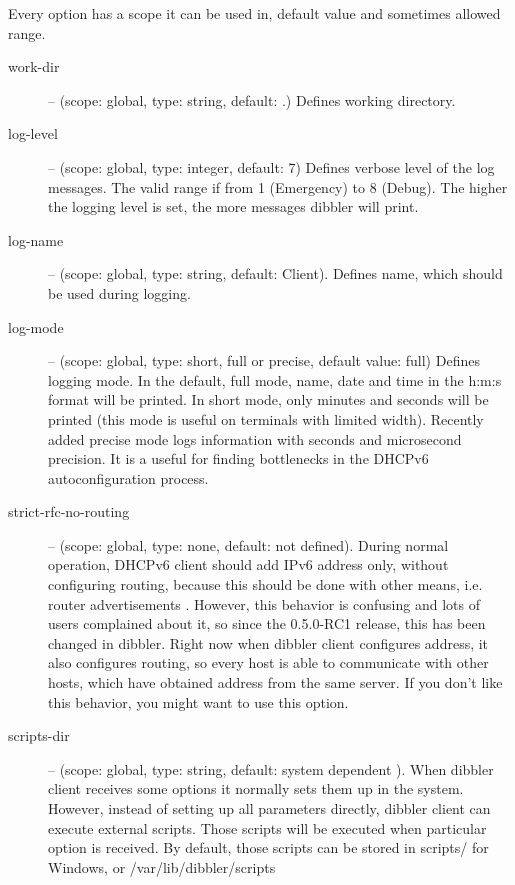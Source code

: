 Every option has a scope it can be used in, default value and
sometimes allowed range. 

\begin{description}
 \item[work-dir] -- (scope: global, type: string, default: .) Defines working
	    directory.
 \item[log-level] -- (scope: global, type: integer, default: 7) Defines
	    verbose level of the log messages. The valid range if
	    from 1 (Emergency) to 8 (Debug). The higher the logging
	    level is set, the more messages dibbler will print.
 \item[log-name] -- (scope: global, type: string, default: Client). Defines 
	    name, which should be used during logging.
 \item[log-mode] -- (scope: global, type: short, full or precise,
	    default value: full) Defines logging mode. In the
	    default, full mode, name, date and time in the h:m:s format
	    will be printed. In short mode, only minutes and
	    seconds will be printed (this mode is useful on
	    terminals with limited width). Recently added precise
	    mode logs information with seconds and microsecond
	    precision. It is a useful for finding bottlenecks in
	    the DHCPv6 autoconfiguration process.
 \item[strict-rfc-no-routing] -- (scope: global, type: none, default:
	    not defined). During normal operation, DHCPv6 client
	    should add IPv6 address only, without configuring
	    routing, because this should be done with other means,
	    i.e. router advertisements \cite{rfc2461}. However,
	    this behavior is confusing and lots of users complained
	    about it, so since the 0.5.0-RC1 release, this has been changed
	    in dibbler. Right now when dibbler client configures
	    address, it also configures routing, so every host is
	    able to communicate with other hosts, which have
	    obtained address from the same server. If you don't
	    like this behavior, you might want to use this option.
\item[scripts-dir] -- (scope: global, type: string, default: system
            dependent ). When
            dibbler client receives some options it normally sets them
            up in the system. However, instead of setting up all
            parameters directly, dibbler client can execute external
            scripts. Those scripts will be executed when particular
            option is received. By default, those scripts can be
            stored in scripts/ for Windows, or /var/lib/dibbler/scripts

\end{description}
